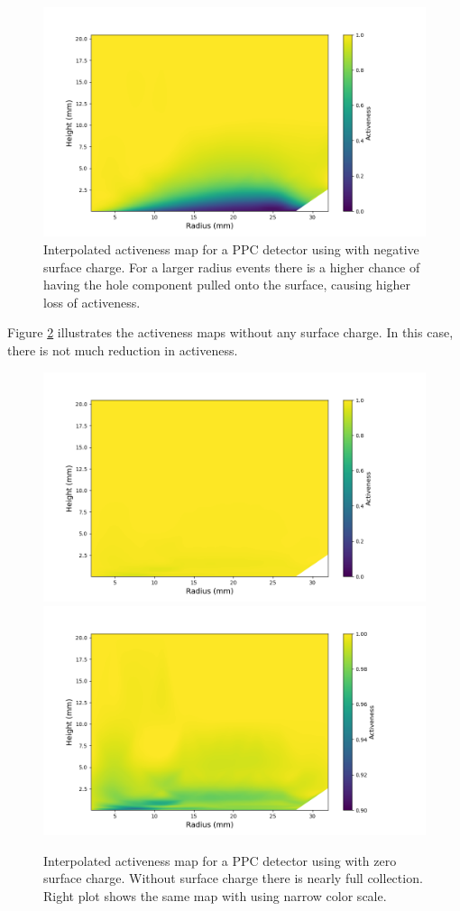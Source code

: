 \begin{figure}%
\centering
\includegraphics[trim={1.4cm 0.5cm 3.2cm 1.755cm},clip,width=0.95\linewidth]{ch5/figs/activeness_map_cubic_sc=-0.3_ponama_1_5000.png}

\caption{Interpolated activeness map for a PPC detector using \ehd with negative surface charge. For a larger radius events there is a higher chance of having the hole component pulled onto the surface, causing higher loss of activeness.}
\label{ch5_fig_activeness_map_neg}
\end{figure}

Figure \ref{ch5_fig_interpolated_activeness_map_0} illustrates the activeness maps without any surface charge. In this case, there is not much reduction in activeness. 

\begin{figure}%
\centering
\includegraphics[trim={1.5cm 0cm 3.3cm 1cm},clip,width=0.49\linewidth]{ch5/figs/activeness_map_cubic_sc=0.0_ponama_1_5000_linear_full.png}
\includegraphics[trim={1.5cm 0cm 3.3cm 1cm},clip,width=0.49\linewidth]{ch5/figs/activeness_map_cubic_sc=0.0_ponama_1_5000_linear.png}
\caption{Interpolated activeness map for a PPC detector using \ehd with zero surface charge. Without surface charge there is nearly full collection. Right plot shows the same map with using narrow color scale.}
\label{ch5_fig_interpolated_activeness_map_0}
\end{figure}

